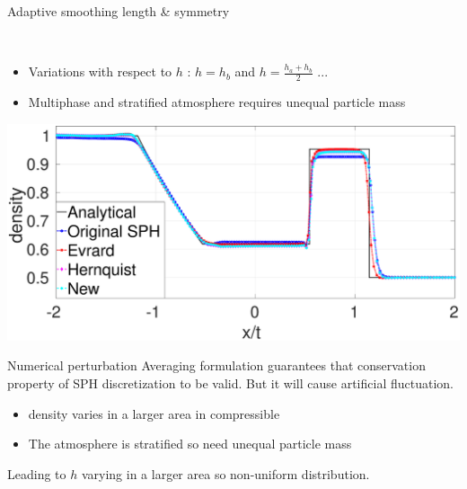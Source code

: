 \documentclass{beamer}
\begin{document}
\begin{frame}{Adaptive smoothing length \& symmetry}
\begin{minipage}{.32\textwidth}
\end{minipage}%
\\
\begin{itemize}
\item Variations with respect to $h$ :
$h=h_b$ and $h= \frac{h_a+h_b}{2}$ ...
\item Multiphase and stratified atmosphere requires unequal particle mass
\end{itemize}
\center
\begin{minipage}{.42\textwidth}
        \centering
        \includegraphics[width=0.808 \textwidth]{./Chapter-3/Figures/SM-Adapt-MEs}
\end{minipage}%

\end{frame}

\begin{frame}{Numerical perturbation}
Averaging formulation guarantees that conservation property of SPH discretization to be valid. But it will cause artificial fluctuation. \\
\begin{minipage}{.480\linewidth} 
\end{minipage}
\hfill
\begin{minipage}{.480\linewidth} 
\end{minipage}
%  
\begin{itemize}
\item density varies in a larger area in compressible
\item The atmosphere is stratified so need unequal particle mass
\end{itemize}
Leading to $h$ varying in a larger area so non-uniform distribution.
\end{frame}
\end{document}
